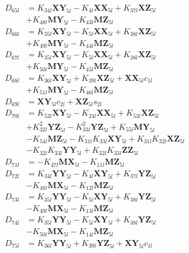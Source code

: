 \begin{multicols}{2}
\begin{align}
D_{65l} &= K_{34l}\mathbf{XY}_{5l} - K_{4l}\mathbf{XX}_{5l} + K_{37l}\mathbf{XZ}_{5l}  \nonumber \\
&+ K_{48l}\mathbf{MY}_{5l} - K_{43l}\mathbf{MZ}_{5l} \nonumber \\
D_{66l} &= K_{35l}\mathbf{XY}_{5l} - K_{5l}\mathbf{XX}_{5l} + K_{38l}\mathbf{XZ}_{5l}  \nonumber \\
&+ K_{49l}\mathbf{MY}_{5l} - K_{44l}\mathbf{MZ}_{5l} \nonumber \\
D_{67l} &= K_{35l}\mathbf{XY}_{5l} - K_{5l}\mathbf{XX}_{5l} + K_{38l}\mathbf{XZ}_{5l}  \nonumber \\
&+ K_{50l}\mathbf{MY}_{5l} - K_{45l}\mathbf{MZ}_{5l} \nonumber \\
D_{68l} &= K_{36l}\mathbf{XY}_{5l} + K_{39l}\mathbf{XZ}_{5l} + \mathbf{XX}_{5l}c_{1l}  \nonumber \\
&+ K_{51l}\mathbf{MY}_{5l} - K_{46l}\mathbf{MZ}_{5l} \nonumber \\
D_{69l} &= \mathbf{XY}_{5l}c_{2l} + \mathbf{XZ}_{5l}s_{2l} \nonumber \\
D_{70l} &= K_{52l}\mathbf{XY}_{5l} - K_{24l}\mathbf{XX}_{5l} + K_{53l}\mathbf{XZ}_{5l}  \nonumber \\
&+ K_{32l}^2\mathbf{YZ}_{5l} - K_{33l}^2\mathbf{YZ}_{5l} + K_{55l}\mathbf{MY}_{5l}  \nonumber \\
&- K_{54l}\mathbf{MZ}_{5l} - K_{31l}K_{33l}\mathbf{XY}_{5l} + K_{31l}K_{32l}\mathbf{XZ}_{5l}  \nonumber \\
&- K_{32l}K_{33l}\mathbf{YY}_{5l} + K_{32l}K_{33l}\mathbf{ZZ}_{5l} \nonumber \\
D_{71l} &= - K_{47l}\mathbf{MX}_{5l} - K_{11l}\mathbf{MZ}_{5l} \nonumber \\
D_{72l} &= K_{34l}\mathbf{YY}_{5l} - K_{4l}\mathbf{XY}_{5l} + K_{37l}\mathbf{YZ}_{5l}  \nonumber \\
&- K_{48l}\mathbf{MX}_{5l} - K_{12l}\mathbf{MZ}_{5l} \nonumber \\
D_{73l} &= K_{35l}\mathbf{YY}_{5l} - K_{5l}\mathbf{XY}_{5l} + K_{38l}\mathbf{YZ}_{5l}  \nonumber \\
&- K_{49l}\mathbf{MX}_{5l} - K_{13l}\mathbf{MZ}_{5l} \nonumber \\
D_{74l} &= K_{35l}\mathbf{YY}_{5l} - K_{5l}\mathbf{XY}_{5l} + K_{38l}\mathbf{YZ}_{5l}  \nonumber \\
&- K_{50l}\mathbf{MX}_{5l} - K_{14l}\mathbf{MZ}_{5l} \nonumber \\
D_{75l} &= K_{36l}\mathbf{YY}_{5l} + K_{39l}\mathbf{YZ}_{5l} + \mathbf{XY}_{5l}c_{1l}  \nonumber \\

\end{align}
\end{multicols}
